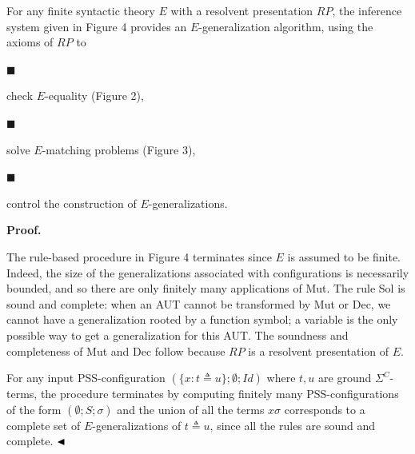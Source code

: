 For any finite syntactic theory $E$ with a resolvent presentation $RP$, the inference system given in Figure 4 provides an $E$-generalization algorithm, using the axioms of $RP$ to\par
  
\par\noindent  $\blacksquare$ 
 
check $E$-equality (Figure 2),\par
 
 
 
\par\noindent  $\blacksquare$ 
 
solve $E$-matching problems (Figure 3),\par
 
 
 
\par\noindent  $\blacksquare$ 
 
control the construction of $E$-generalizations.\par
 
 
  
 
 
 
\par\medskip\noindent\textbf{Proof.}\par
 
 
The rule-based procedure in Figure 4 terminates since $E$ is assumed to be finite. Indeed, the size of the generalizations associated with configurations is necessarily bounded, and so there are only finitely many applications of Mut. The rule Sol is sound and complete: when an AUT cannot be transformed by Mut or Dec, we cannot have a generalization rooted by a function symbol; a variable is the only possible way to get a generalization for this AUT. The soundness and completeness of Mut and Dec follow because $RP$ is a resolvent presentation of $E$.\par
 
 
 
For any input PSS-configuration $(\{x:t\triangleq u\};\emptyset;\mathit{Id})$ where $t,u$ are ground ${\Sigma}^{C}$-terms, the procedure terminates by computing finitely many PSS-configurations of the form $(\emptyset;S;\sigma)$ and the union of all the terms $x\sigma$ corresponds to a complete set of $E$-generalizations of $t\triangleq u$, since all the rules are sound and complete. $\hfill\blacktriangleleft$\par
 
